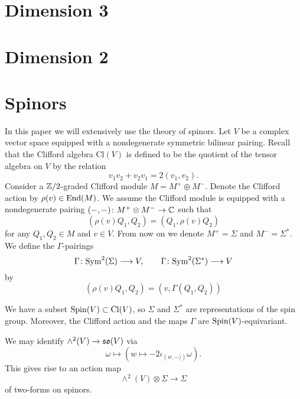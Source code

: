 \documentclass[10pt, oneside]{article}
\newcommand{\Cl}{\mathrm{Cl}}
\begin{document}
\section{Dimension 3}


\section{Dimension 2}



\appendix

\section{Spinors}
\label{sect:spinors}

In this paper we will extensively use the theory of spinors. Let $V$ be a complex vector space equipped with a nondegenerate symmetric bilinear pairing. Recall that the Clifford algebra $\Cl(V)$ is defined to be the quotient of the tensor algebra on $V$ by the relation
\[v_1 v_2 + v_2 v_1 = 2(v_1, v_2).\]
Consider a $\mathbb Z/2$-graded Clifford module $M=M^+\oplus M^-$. Denote the Clifford action by $\rho(v)\in\operatorname{End}(M)$. We assume the Clifford module is equipped with a nondegenerate pairing $(-, -)\colon M^+\otimes M^-\rightarrow \mathbb C$ such that
\[(\rho(v) Q_1, Q_2) = (Q_1, \rho(v) Q_2)\]
for any $Q_1, Q_2\in M$ and $v\in V$. From now on we denote $M^+=\Sigma$ and $M^-=\Sigma^*$. We define the $\Gamma$-pairings
\[\Gamma\colon{\rm Sym}^2(\Sigma)\longrightarrow V,\qquad \Gamma\colon{\rm Sym}^2(\Sigma^*)\longrightarrow V\]
by
\begin{equation}
(\rho(v) Q_1, Q_2) = (v, \Gamma(Q_1, Q_2))
\label{eq:Gammaspinorpairing}
\end{equation}

We have a subset $\Spin(V)\subset \Cl(V)$, so $\Sigma$ and $\Sigma^*$ are representations of the spin group. Moreover, the Clifford action and the maps $\Gamma$ are $\mathrm{Spin}(V)$-equivariant.

We may identify $\wedge^2(V)\rightarrow \mathfrak{so}(V)$ via
\[\omega\mapsto (w\mapsto -2\iota_{(w, -\rangle)} \omega).\]
This gives rise to an action map
\[\wedge^2(V)\otimes \Sigma\longrightarrow \Sigma\]
of two-forms on spinors.
\end{document}
